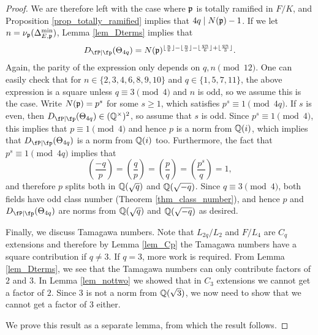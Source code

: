 \begin{proof}
    We are therefore left with the case where $\mathfrak{p}$ is totally ramified in $F/K$, and Proposition \ref{prop_totally_ramified} implies that $4q\mid N(\mathfrak{p})-1$. If we let $n=\nu_{\mathfrak{p}}(\Delta_{E,\mathfrak{p}}^{\min})$, Lemma \ref{lem_Dterms} implies that 
    \begin{equation*}\label{eqn_DtermsC4p}
        \Dp(\Theta_{4q})=N(\pp)^{\floor{\frac{n}{6}}-\floor{\frac{n}{3}}-\floor{\frac{qn}{6}}+\floor{\frac{qn}{3}}}.
    \end{equation*}
    Again, the parity of the expression only depends on $q,n\pmod{12}$. One can easily check that for $n\in\{2,3,4,6,8,9,10\}$ and $q\in\{1,5,7,11\}$, the above expression is a square unless $q\equiv 3\pmod{4}$ and $n$ is odd, so we assume this is the case. Write $N(\mathfrak{p})=p^s$ for some $s\geq1$, which satisfies $p^s\equiv1\pmod{4q}$. If $s$ is even, then $\Dp(\Theta_{4q})\in\QQss$, so assume that $s$ is odd. Since $p^s\equiv1\pmod{4}$, this implies that $p\equiv1\pmod{4}$ and hence $p$ is a norm from $\mathbb{Q}(i)$, which implies that $\Dp(\Theta_{4q})$ is a norm from $\mathbb{Q}(i)$ too. Furthermore, the fact that $p^s\equiv1\pmod{4q}$ implies that
    $$\left(\frac{-q}{p}\right)=\left(\frac{q}{p}\right)=\left(\frac{p}{q}\right)=\left(\frac{p^s}{q}\right)=1,$$
    and therefore $p$ splits both in $\mathbb{Q}(\sqrt{q})$ and $\mathbb{Q}(\sqrt{-q})$. Since $q\equiv3\pmod{4}$, both fields have odd class number (Theorem \ref{thm_class_number}), and hence $p$ and $\Dp(\Theta_{4q})$ are norms from $\mathbb{Q}(\sqrt{q})$ and $\mathbb{Q}(\sqrt{-q})$ as desired. 

    Finally, we discuss Tamagawa numbers. Note that $L_{2q}/L_2$ and $F/L_4$ are $C_q$ extensions and therefore by Lemma \ref{lem_Cp} the Tamagawa numbers have a square contribution if $q\neq3$. If $q=3$, more work is required. From Lemma \ref{lem_Dterms}, we see that the Tamagawa numbers can only contribute factors of $2$ and $3$. In Lemma \ref{lem_nottwo} we showed that in $C_3$ extensions we cannot get a factor of $2$. Since $3$ is not a norm from $\mathbb{Q}(\sqrt{3})$, we now need to show that we cannot get a factor of $3$ either. 
    
    We prove this result as a separate lemma, from which the result follows.    
\end{proof}

